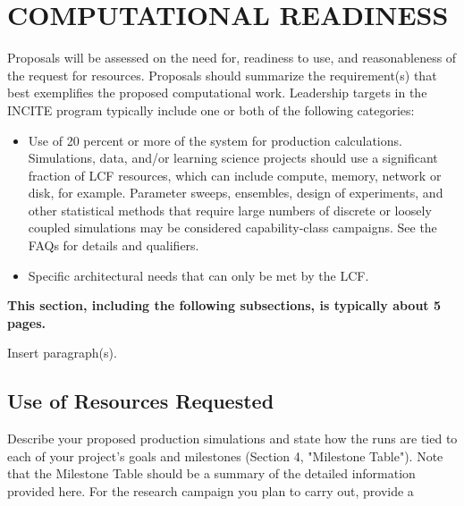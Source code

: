 \documentclass[11pt,letterpaper,english]{article}
\begin{document}
\vspace{-.25in}
\section{COMPUTATIONAL READINESS}
\vspace{-.2in}

Proposals will be assessed on the need for, readiness to use, and reasonableness of the request for resources. Proposals should summarize the requirement(s) that best exemplifies the proposed computational work. Leadership targets in the INCITE program typically include one or both of the following categories:
\begin{itemize}[noitemsep,topsep=0pt]
\item Use of 20 percent or more of the system for production calculations. Simulations, data, and/or learning science projects should use a significant fraction of LCF resources, which can include compute, memory, network or disk, for example. Parameter sweeps, ensembles, design of experiments, and other statistical methods that require large numbers of discrete or loosely coupled simulations may be considered capability-class campaigns. See the FAQs for details and qualifiers.\\
\item Specific architectural needs that can only be met by the LCF.
\end{itemize}
\vspace{.1 in}
{ \bf This section, including the following subsections, is typically about 5 pages.}

Insert paragraph(s).

\vspace{-.25in}
\subsection{Use of Resources Requested}
\vspace{-.2in}

Describe your proposed production simulations and state how the runs are tied to each of your project's goals and milestones (Section 4, "Milestone Table"). Note that the Milestone Table should be a summary of the detailed information provided here.  For the research campaign you plan to carry out, provide a
\end{document}
